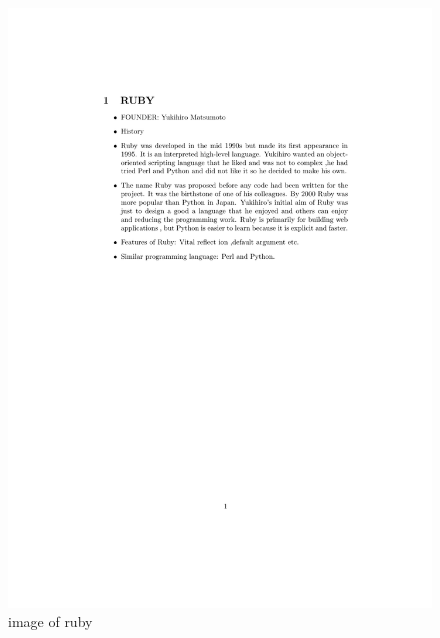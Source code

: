\documentclass{article}
\begin{document}
\begin{figure}
	\centering
	\includegraphics[width=0.7\linewidth]{ruby}
	\caption{image of ruby}
	\label{fig:ruby}
\end{figure}
\end{document}
